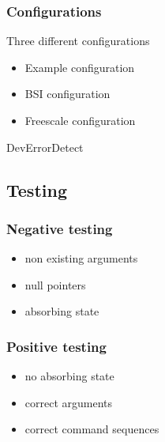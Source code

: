 \documentclass{beamer}
\begin{document}
\begin{frame}
  \frametitle{Configurations}
  Three different configurations\\
  \begin{itemize}
    \item Example configuration
    \item BSI configuration
    \item Freescale configuration
  \end{itemize}
  DevErrorDetect
\end{frame}

\subsection{Testing}

\begin{frame}
  \frametitle{Negative testing}
  \begin{itemize}
    \item non existing arguments
    \item null pointers
    \item absorbing state
  \end{itemize}
\end{frame}


\begin{frame}
  \frametitle{Positive testing}
  \begin{itemize}
    \item no absorbing state
    \item correct arguments
    \item correct command sequences
  \end{itemize}
\end{frame}

\end{document}
